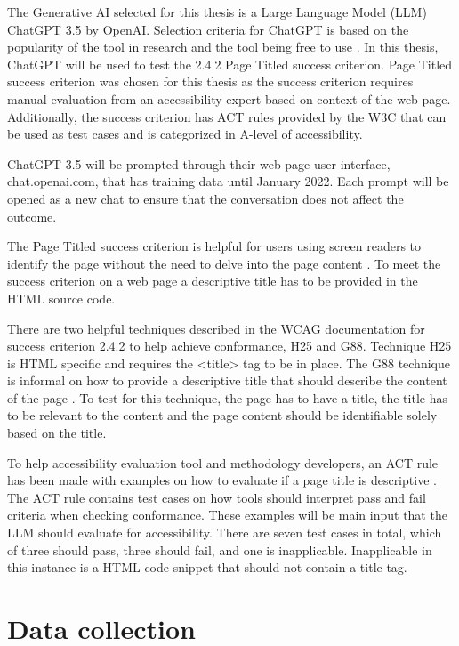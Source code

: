 The Generative AI selected for this thesis is a Large Language Model (LLM) ChatGPT 3.5 by OpenAI. Selection criteria for ChatGPT is based on the popularity of the tool in research and the tool being free to use \citep{ouyang2023llm, white2023prompt}. In this thesis, ChatGPT will be used to test the 2.4.2 Page Titled success criterion. Page Titled success criterion was chosen for this thesis as the success criterion requires manual evaluation from an accessibility expert based on context of the web page. Additionally, the success criterion has ACT rules provided by the W3C that can be used as test cases and is categorized in A-level of accessibility. 

ChatGPT 3.5 will be prompted through their web page user interface, chat.openai.com, that has training data until January 2022. Each prompt will be opened as a new chat to ensure that the conversation does not affect the outcome. 

The Page Titled success criterion is helpful for users using screen readers to identify the page without the need to delve into the page content \citep{wcag_page_titled}. To meet the success criterion on a web page a descriptive title has to be provided in the HTML source code. 

There are two helpful techniques described in the WCAG documentation for success criterion 2.4.2 to help achieve conformance, H25 and G88. Technique H25 is HTML specific and requires the <title> tag to be in place. The G88 technique is informal on how to provide a descriptive title that should describe the content of the page \citep{g88}. To test for this technique, the page has to have a title, the title has to be relevant to the content and the page content should be identifiable solely based on the title.

To help accessibility evaluation tool and methodology developers, an ACT rule has been made with examples on how to evaluate if a page title is descriptive \citep{act_rule_g88}. The ACT rule contains test cases on how tools should interpret pass and fail criteria when checking conformance. These examples will be main input that the LLM should evaluate for accessibility. There are seven test cases in total, which of three should pass, three should fail, and one is inapplicable. Inapplicable in this instance is a HTML code snippet that should not contain a title tag. 

\section{Data collection}



